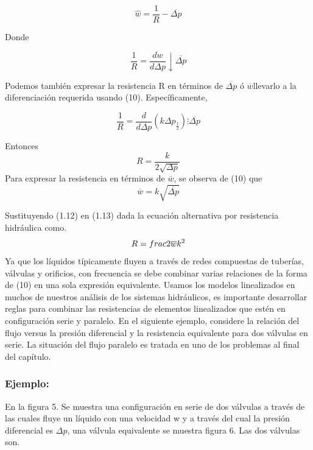 \documentclass[a4paper,12pt,twoside]{proyectotanquesecci}
\begin{document}
\begin{equation}
\widehat{w}=\frac{1}{R}-\overline{\Delta p}
\end{equation}

Donde

\begin{equation}
\frac{1}{R}=\frac{dw}{d\Delta p}\downarrow\overline{\Delta p}
\end{equation}

Podemos también expresar la resistencia R en términos de $\overline{\Delta p}$ ó $\overline{w}$llevarlo a la diferenciación requerida usando (10). Específicamente,

\begin{equation}
\frac{1}{R}=\frac{d}{d\Delta p}(k\Delta p_{\frac{1}{2}})\vdots \overline{\Delta p}
\end{equation}

Entonces
\begin{equation}
R=\frac{k}{2\sqrt{\Delta p}}
\end{equation} 
Para expresar la resistencia en términos de $\overline{w}$, se observa de (10) que 
\begin{equation}
\overline{w}=k\sqrt{\overline{\Delta p}}
\end{equation}

Sustituyendo (1.12) en (1.13) dada la ecuación alternativa por resistencia hidráulica como.
\begin{equation}
R=\\frac{2\overline{w}}{k^{2}}
\end{equation}
Ya que los líquidos típicamente fluyen a través de redes compuestas de tuberías, válvulas y orificios, con frecuencia se debe combinar varias relaciones de la forma de (10) en una sola expresión equivalente. Usamos los modelos linealizados en muchos de nuestros análisis de los sistemas hidráulicos, es importante desarrollar reglas para combinar las resistencias de elementos linealizados que estén en configuración serie y paralelo. En el siguiente ejemplo, considere la relación del flujo versus la presión diferencial y la resistencia equivalente para dos válvulas en serie. La situación del flujo paralelo es tratada en uno de los problemas al final del capítulo.

\subsubsection{Ejemplo:}

En la figura 5. Se muestra una configuración en serie de dos válvulas a través  de las cuales fluye un líquido con una velocidad w y a través del cual la presión diferencial es ${\Delta p}$, una válvula equivalente se muestra figura 6. Las dos válvulas son.
\end{document}
